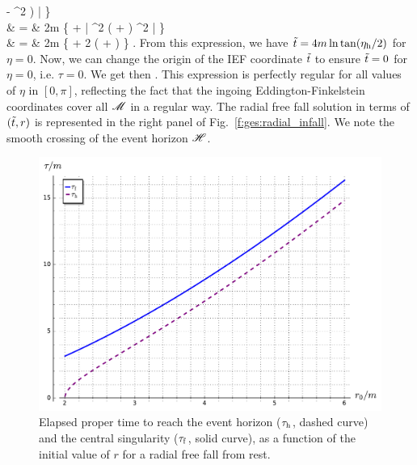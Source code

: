         - \tan^2 \right) \right| \right\} \nonumber \\
    & = & 2m \left\{  
    + \ln \left| \cos^2
    \left( \tan{} + \tan{} \right) ^2 \right| \right\} \nonumber \\
    & = & 2m \left\{  
    +  2 \ln \left( \cos{} \tan{} + \sin {} \right) \right\} . \nonumber
\eea
From this expression, we have ${\tilde t}= 4 m \ln \tan(\eta_{\rm h}/2)$ for $\eta=0$.
Now, we can change the origin of the IEF coordinate ${\tilde t}$ to ensure ${\tilde t}=0$ for $\eta=0$,
i.e. $\tau=0$.
We get then
\be \label{e:ges:sol_radial_infall_ti}
     .
\ee
This expression is perfectly regular for all values of $\eta$ in $[0,\pi]$, reflecting
the fact that the ingoing Eddington-Finkelstein coordinates cover all $\mathscr{M}$
in a regular way. The radial free fall solution in terms of $({\tilde t}, r)$
is represented in the right panel of Fig.~\ref{f:ges:radial_infall}. We note the
smooth crossing of the event horizon $\mathscr{H}$.

\begin{figure}
\centerline{\includegraphics[height=0.4\textheight]{ges_infall_time.pdf}}
\caption[]{\label{f:ges:infall_time} \footnotesize
Elapsed proper time to reach the event horizon ($\tau_{\rm h}$, dashed curve)
and the central singularity ($\tau_{\rm f}$, solid curve), as a function
of the initial value of $r$ for a radial free fall from rest.}
\end{figure}

